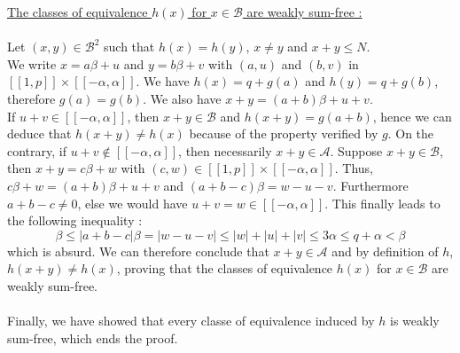\underline{The classes of equivalence \(h(x)\) for \(x \in \mathcal{B}\) are weakly sum-free :}
\\
\\
Let \((x,y) \in \mathcal{B}^2\) such that \(h(x) = h(y)\), \(x \neq y\) and \(x + y \leqslant N\).\\
We write \(x = a\beta + u\) and \(y = b\beta + v\) with \((a,u)\) and \((b,v)\) in \([\![1,p]\!] \times
[\![-\alpha,\alpha]\!]\).
We have \(h(x) = q + g(a)\) and \(h(y) = q + g(b)\), therefore \(g(a) = g(b)\). We also have \(x+y = (a+b)\beta + u
+v\).\\
If \(u + v \in [\![-\alpha,\alpha]\!]\), then \(x+y \in \mathcal{B}\) and \(h(x+y) = g(a+b)\), hence we can deduce that
\(h(x+y) \neq h(x)\) because of the property verified by \(g\). On the contrary, if \(u+v \notin
[\![-\alpha,\alpha]\!]\), then necessarily \(x+y \in \mathcal{A}\). Suppose \(x+y \in \mathcal{B}\), then \(x+y =
c\beta+ w\) with \((c,w) \in [\![1,p]\!] \times [\![-\alpha,\alpha]\!]\). Thus, \(c\beta + w = (a+b)\beta + u + v\) and
\((a+b-c)\beta = w-u-v\). Furthermore \(a+b-c \neq 0\), else we would have \(u+v = w \in [\![-\alpha,\alpha]\!]\). This
finally leads to the following inequality :
\[\beta \leqslant |a+b-c|\beta = |w-u-v| \leqslant |w| + |u| + |v| \leqslant 3\alpha \leqslant q + \alpha < \beta
\]
which is absurd. We can therefore conclude that \(x+y \in \mathcal{A}\) and by definition of \(h\), \(h(x+y) \neq
h(x)\), proving that the classes of equivalence \(h(x)\) for \(x \in \mathcal{B}\) are weakly sum-free.\\
\\
Finally, we have showed that every classe of equivalence induced by \(h\) is weakly sum-free, which ends the proof.
